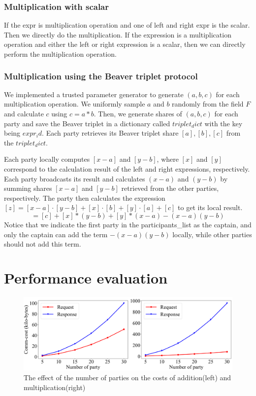 \documentclass[10pt,conference,compsocconf]{IEEEtran}
\begin{document}
\subsubsection{Multiplication with scalar}
If the expr is multiplication operation and one of left and right expr is the scalar. Then we directly do the multiplication.
If the expression is a multiplication operation and either the left or right expression is a scalar, then we can directly perform the multiplication operation.
\subsubsection{Multiplication using the Beaver triplet protocol}
We implemented a trusted parameter generator to generate $(a, b, c)$ for each multiplication operation. We uniformly sample $a$ and $b$ randomly from the field $F$ and calculate $c$ using $c = a*b$. Then, we generate shares of $(a, b, c)$ for each party and save the Beaver triplet in a dictionary called $triplet_dict$ with the key being $expr_id$. Each party retrieves its Beaver triplet share $[a], [b], [c]$ from the $triplet_dict$.

Each party locally computes $[x-a]$ and $[y-b]$, where $[x]$ and $[y]$ correspond to the calculation result of the left and right expressions, respectively. Each party broadcasts its result and calculates $(x-a)$ and $(y-b)$ by summing shares $[x-a]$ and $[y-b]$ retrieved from the other parties, respectively. The party then calculates the expression $[z] = [x-a]\cdot[y-b] + [x]\cdot[b] + [y]\cdot[a] + [c]$ to get its local result.
\begin{equation}
[z] = [c] + [x] * (y-b) + [y] * (x-a) - (x-a)(y-b)
\end{equation}
Notice that we indicate the first party in the participants\_list as the captain, and only the captain can add the term $-(x-a)(y-b)$ locally, while other parties should not add this term.

\section{Performance evaluation}
\begin{figure}[!t]
\includegraphics[width=1.0\linewidth]{figure/communication_cost_res_party_increase_add_mul.png}
\caption{The effect of the number of parties on the costs of addition(left) and multiplication(right)}
\label{figure-1}
\end{figure}
\end{document}
